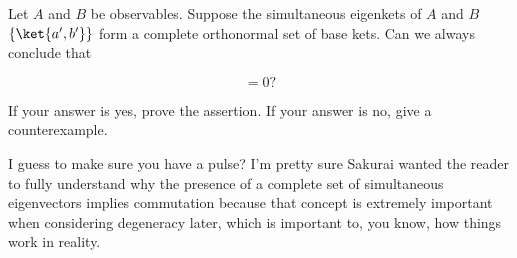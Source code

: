 \begin{question}

  Let $A$ and $B$ be observables. Suppose the simultaneous eigenkets
  of $A$ and $B$ $\left\{\ket{a',b'}\right\}$ form a complete
  orthonormal set of base kets. Can we always conclude that

  \begin{equation*}
    [A, B] = 0?
  \end{equation*}

  If your answer is yes, prove the assertion. If your answer is no,
  give a counterexample.

\end{question}

\begin{purpose}
  I guess to make sure you have a pulse?  I'm pretty sure Sakurai
  wanted the reader to fully understand why the presence of a complete
  set of simultaneous eigenvectors implies commutation because that
  concept is extremely important when considering degeneracy later,
  which is important to, you know, how things work in reality.
\end{purpose}


